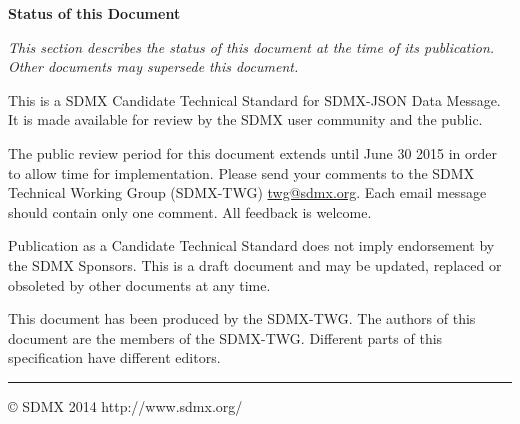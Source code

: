 \textbf{Status of this Document}

\emph{This section describes the status of this document at the time of
its publication. Other documents may supersede this document.}

This is a SDMX Candidate Technical Standard for SDMX-JSON Data Message.
It is made available for review by the SDMX user community and the
public.

The public review period for this document extends until June 30 2015 in
order to allow time for implementation. Please send your comments to the
SDMX Technical Working Group (SDMX-TWG)
\href{mailto:twg@sdmx.org}{twg@sdmx.org}. Each email message should
contain only one comment. All feedback is welcome.

Publication as a Candidate Technical Standard does not imply endorsement
by the SDMX Sponsors. This is a draft document and may be updated,
replaced or obsoleted by other documents at any time.

This document has been produced by the SDMX-TWG. The authors of this
document are the members of the SDMX-TWG. Different parts of this
specification have different editors.

\begin{center}\rule{3in}{0.4pt}\end{center}

\null
\vfill

© SDMX 2014 http://www.sdmx.org/
